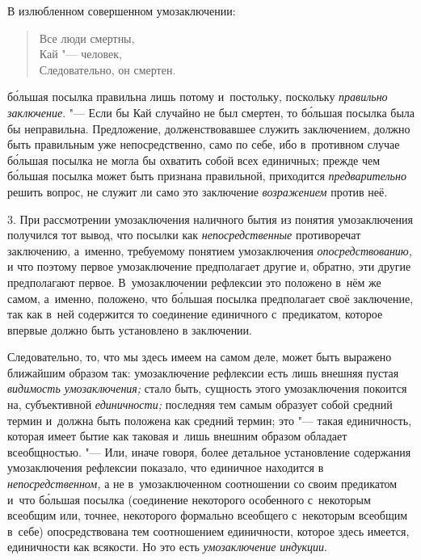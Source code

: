 В излюбленном совершенном умозаключении:

\begin{verse}
Все люди смертны,\\
Кай "--- человек,\\
Следовательно, он смертен.
\end{verse}

\noindent б\'{о}льшая посылка правильна лишь потому и~постольку, поскольку
{\em правильно заключение}. "---
Если бы Кай случайно не был смертен, то б\'{о}льшая посылка была
бы неправильна. Предложение, долженствовавшее служить заключением, должно
быть правильным уже непосредственно, само по себе, ибо в~противном случае
б\'{о}льшая посылка не могла бы охватить собой всех единичных; прежде чем
б\'{о}льшая посылка может быть признана правильной, приходится
{\em предварительно} решить вопрос, не служит ли само это заключение
{\em возражением} против неё.

3. При рассмотрении умозаключения наличного бытия из понятия
умозаключения получился тот вывод, что посылки как {\em непосредственные}
противоречат заключению, а~именно, требуемому понятием
умозаключения {\em опосредствованию,}
и что поэтому первое умозаключение предполагает другие и,
обратно, эти другие предполагают первое. В~умозаключении рефлексии это
положено в~нём же самом, а~именно, положено, что б\'{о}льшая
посылка предполагает своё заключение, так как в~ней содержится то
соединение единичного с~предикатом, которое впервые должно быть установлено
в заключении.

Следовательно, то, что мы здесь имеем на самом деле, может
быть выражено ближайшим образом так: умозаключение рефлексии есть лишь
внешняя пустая {\em видимость
умозаключения;} стало быть, сущность этого умозаключения
покоится на, субъективной {\em единичности;}
последняя тем самым образует собой средний термин и~должна
быть положена как средний термин; это "--- такая единичность,
которая имеет бытие как таковая и~лишь внешним образом обладает
всеобщностью. "--- Или, иначе говоря, более детальное
установление содержания умозаключения рефлексии показало, что единичное
находится в {\em непосредственном,}
а не в~умозаключенном соотношении со своим предикатом и~что
б\'{о}льшая посылка (соединение некоторого особенного с~некоторым всеобщим или,
точнее, некоторого формально всеобщего с~некоторым всеобщим в~себе)
опосредствована тем соотношением единичности, которое здесь имеется,
единичности как всякости. Но это есть {\em умозаключение индукции}.


